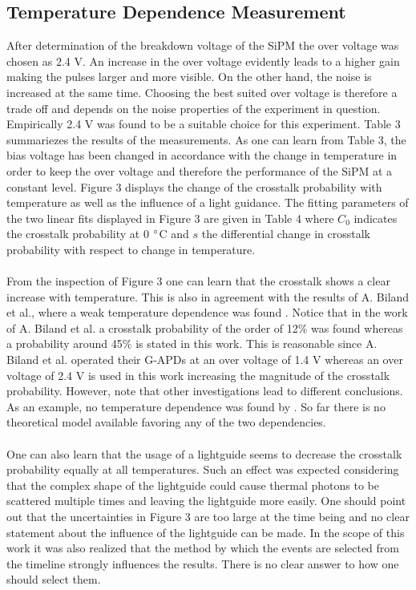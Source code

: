 \documentclass[10pt,a4paper]{article}
\begin{document}
\begin{multicols}{2}
\subsection{Temperature Dependence Measurement}
After determination of the breakdown voltage of the SiPM the over voltage was chosen as 2.4 V. An increase in the over voltage evidently leads to a higher gain making the pulses larger and more visible. On the other hand, the noise is increased at the same time. Choosing the best suited over voltage is therefore a trade off and depends on the noise properties of the experiment in question. Empirically 2.4 V was found to be a suitable choice for this experiment. Table 3 summariezes the results of the measurements. As one can learn from Table 3, the bias voltage has been changed in accordance with the change in temperature in order to keep the over voltage and therefore the performance of the SiPM at a constant level. Figure 3 displays the change of the crosstalk probability with temperature as well as the influence of a light guidance. The fitting parameters of the two linear fits displayed in Figure 3 are given in Table 4 where $C_0$ indicates the crosstalk probability at 0 $\degree$C and $s$ the differential change in crosstalk probability with respect to change in temperature. \\ \\ \noindent
From the inspection of Figure 3 one can learn that the crosstalk shows a clear increase with temperature. This is also in agreement with the results of A. Biland et al., where a weak temperature dependence was found \cite{gapd}. Notice that in the work of A. Biland et al. a crosstalk probability of the order of 12$\%$ was found whereas a probability around 45$\%$ is stated in this work. This is reasonable since A. Biland et al. operated their G-APDs at an over voltage of 1.4 V whereas an over voltage of 2.4 V is used in this work increasing the magnitude of the crosstalk probability. However, note that other investigations lead to different conclusions. As an example, no temperature dependence was found by \cite{crossref}. So far there is no theoretical model available favoring any of the two dependencies. \\ \\  \noindent
One can also learn that the usage of a lightguide seems to decrease the crosstalk probability equally at all temperatures.
Such an effect was expected considering that the complex shape of the lightguide could cause thermal photons to be scattered multiple times and leaving the lightguide more easily. One should point out that the uncertainties in Figure 3 are too large at the time being and no clear statement about the influence of the lightguide can be made. In the scope of this work it was also realized that the method by which the events are selected from the timeline strongly influences the results. There is no clear answer to how one should select them.
\end{multicols}
\end{document}
